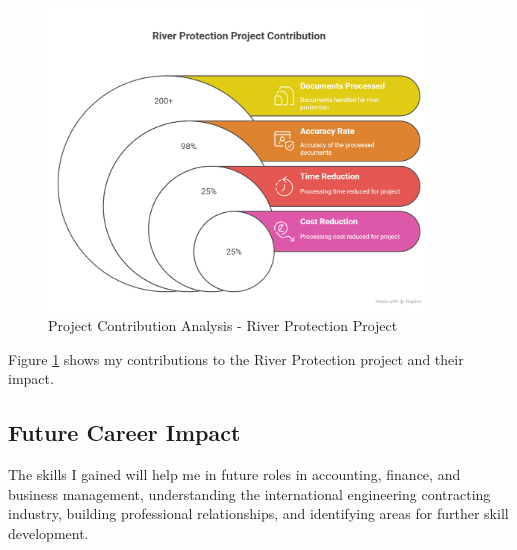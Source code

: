 \begin{figure}[H]
    \centering
    \includegraphics[width=0.9\textwidth]{assets/images/project_contribution_chart.png}
    \caption{Project Contribution Analysis - River Protection Project}
    \label{fig:project_contribution_chart}
\end{figure}

Figure \ref{fig:project_contribution_chart} shows my contributions to the River Protection project and their impact.

\subsection{Future Career Impact}
The skills I gained will help me in future roles in accounting, finance, and business management, understanding the international engineering contracting industry, building professional relationships, and identifying areas for further skill development.
